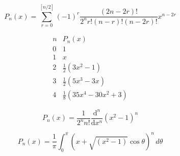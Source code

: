 \[\begin{equation} \label{legenpolydef} P_{n}(x) = \sum_{r=0}^{\left[ n/2 \right]}(-1)^{r}\frac{(2n-2r)!}{2^{n}r!(n-r)!(n-2r)!}x^{n-2r} \end{equation}\]

\[\begin{equation} \label{legenvals} {\begin{array}{r|r}n&P_{n}(x)\\\hline 0&1\\1&x\\2&{\frac {1}{2}}(3x^{2}-1)\\3&{\frac {1}{2}}(5x^{3}-3x)\\4&{\frac {1}{8}}(35x^{4}-30x^{2}+3) \end{array}} \end{equation}\]

\[\begin{equation} \label{thrm3.2} P_{n}(x)={\frac{1}{2^{n}n!}}\frac{\mathrm{d}^{n}}{\mathrm{d}x^{n}}(x^{2}-1)^{n} \end{equation}\]

\[\begin{equation} \label{thrm3.3} P_{n}(x) = \frac{1}{\pi}\int_{0}^{\pi}(x + \sqrt{(x^{2}-1)}\cos{\theta})^{n}\,d\theta \end{equation}\]


